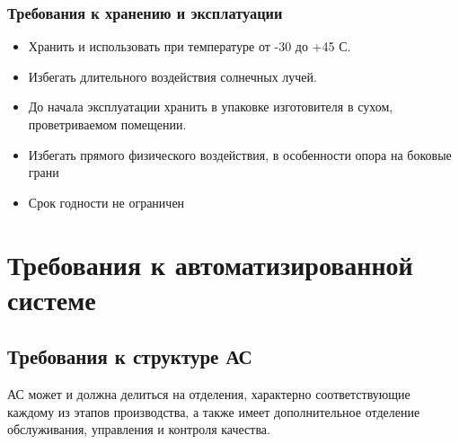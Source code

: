 \documentclass[16pt,a4paper]{article}
\begin{document}
\subsubsection{Требования к хранению и эксплатуации}
\begin{itemize}
    \item Хранить и использовать при температуре от -30 до +45 С.
    \item Избегать длительного воздействия солнечных лучей.
    \item До начала эксплуатации хранить в упаковке изготовителя в сухом, проветриваемом помещении.
    \item Избегать прямого физического воздействия, в особенности опора на боковые грани
    \item Срок годности не ограничен
\end{itemize}
\section{Требования к автоматизированной системе}
\subsection{Требования к структуре АС}
АС может и должна делиться на отделения, характерно соответствующие каждому из этапов производства, а также имеет дополнительное отделение обслуживания, управления и контроля качества. 
\end{document}
